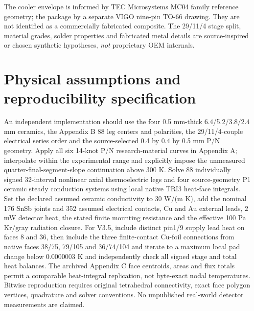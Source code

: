 \documentclass[10pt,a4paper]{article}
\begin{document}
The cooler envelope is informed by TEC Microsystems MC04 family reference geometry; the package by a separate VIGO nine-pin TO-66 drawing. They are not identified as a commercially fabricated composite. The 29/11/4 stage split, material grades, solder properties and fabricated metal details are source-inspired or chosen synthetic hypotheses, \emph{not} proprietary OEM internals.
\clearpage
\section{Physical assumptions and reproducibility specification}
An independent implementation should use the four 0.5 mm-thick 6.4/5.2/3.8/2.4 mm ceramics, the Appendix B 88 leg centers and polarities, the 29/11/4-couple electrical series order and the source-selected 0.4 by 0.4 by 0.5 mm P/N geometry. Apply all six 14-knot P/N research-material curves in Appendix A; interpolate within the experimental range and explicitly impose the unmeasured quarter-final-segment-slope continuation above 300 K.
Solve 88 individually signed 32-interval nonlinear axial thermoelectric legs and four source-geometry P1 ceramic steady conduction systems using local native TRI3 heat-face integrals. Set the declared assumed ceramic conductivity to 30 W/(m K), add the nominal 176 SnSb joints and 352 assumed electrical contacts, Cu and Au external leads, 2 mW detector heat, the stated finite mounting resistance and the effective 100 Pa Kr/gray radiation closure. For V3.5, include distinct pin1/9 supply lead heat on faces 8 and 36, then include the three finite-contact Cu-foil connections from native faces 38/75, 79/105 and 36/74/104 and iterate to a maximum local pad change below 0.0000003 K and independently check all signed stage and total heat balances.
The archived Appendix C face centroids, areas and flux totals permit a comparable heat-integral replication, not byte-exact nodal temperatures. Bitwise reproduction requires original tetrahedral connectivity, exact face polygon vertices, quadrature and solver conventions. No unpublished real-world detector measurements are claimed.
\end{document}
